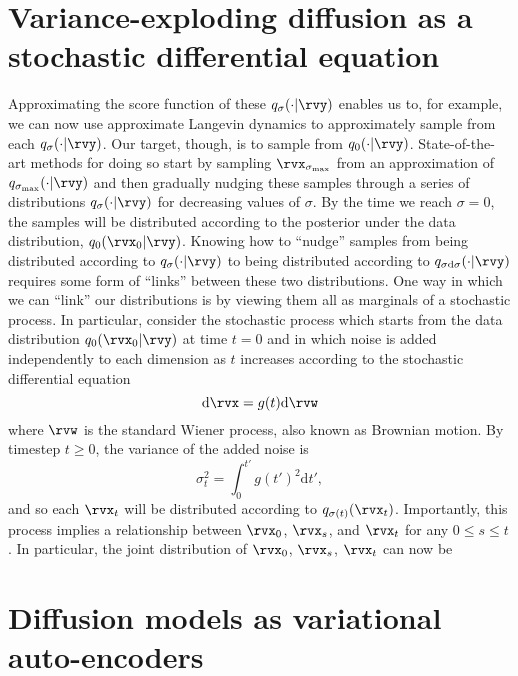 \section{Variance-exploding diffusion as a stochastic differential equation}
Approximating the score function of these $q_\sigma(\cdot|\rvy)$ enables us to, for example, we can now use approximate Langevin dynamics to approximately sample from each $q_\sigma(\cdot|\rvy)$. Our target, though, is to sample from $q_0(\cdot|\rvy)$. State-of-the-art methods for doing so start by sampling $\rvx_{\sigma_\text{max}}$ from an approximation of $q_{\sigma_\text{max}}(\cdot|\rvy)$ and then gradually nudging these samples through a series of distributions $q_{\sigma}(\cdot|\rvy)$ for decreasing values of $\sigma$. By the time we reach $\sigma = 0$, the samples will be distributed according to the posterior under the data distribution, $q_0(\rvx_0|\rvy)$. Knowing how to ``nudge'' samples from being distributed according to $q_{\sigma}(\cdot|\rvy)$ to being distributed according to $q_{\sigma\mathrm{d}\sigma}(\cdot|\rvy)$ requires some form of ``links'' between these two distributions. One way in which we can ``link'' our distributions is by viewing them all as marginals of a stochastic process. In particular, consider the stochastic process which starts from the data distribution $q_0(\rvx_0|\rvy)$ at time $t = 0$ and in which noise is added independently to each dimension as $t$ increases according to the stochastic differential equation
\begin{equation}
    \mathrm{d}\rvx = g(t) \mathrm{d}\rvw
\end{equation}
where $\rvw$ is the standard Wiener process, also known as Brownian motion. By timestep $t \geq 0$, the variance of the added noise is
\begin{equation}
    \sigma_t^2 = \int_0^{t'} g(t')^2 \mathrm{d}t',
\end{equation}
and so each $\rvx_t$ will be distributed according to $q_{\sigma(t)}(\rvx_t)$.  Importantly, this process implies a relationship between $\rvx_0$, $\rvx_s$, and $\rvx_t$ for any $0 \leq s \leq t$. In particular, the joint distribution of $\rvx_0$, $\rvx_s$, $\rvx_t$ can now be 

\section{Diffusion models as variational auto-encoders}

